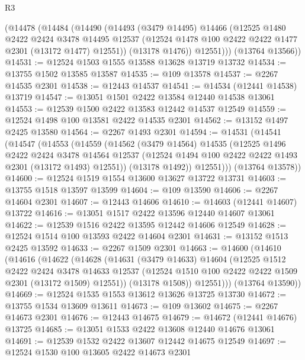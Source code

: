 \begin{lexlean}{R3}
\begin{coremodule}
      (@14478
        (@14484
          (@14490
            (@14493
              (@3479 @14495)
              @14466
              (@12525
                @1480
                @2422
                @2424
                @3478
                @14495
                @12537
                (@12524 @1478 @100 @2422 @2422 @1477 @2301 (@13172 @1477) @12551))
              (@13178 @1476))
            @12551)))
      (@13764 @13566))
@14531 := @12524 @1503 @1555 @13588 @13628 @13719 @13732
@14534 := @13755 @1502 @13585 @13587
@14535 := @109 @13578
@14537 := @2267 @14535 @2301
@14538 := @12443 @14537
@14541 := @14534 (@12441 @14538) @13719
@14547 := @13051 @1501 @2422 @13584 @12440 @14538 @13061
@14553 := @12539 @1500 @2422 @13583 @12442 @14537 @12549
@14559 := @12524 @1498 @100 @13581 @2422 @14535 @2301
@14562 := @13152 @1497 @2425 @13580
@14564 := @2267 @1493 @2301
@14594 := @14531
    (@14541
      (@14547
        (@14553
          (@14559
            (@14562
              (@3479 @14564)
              @14535
              (@12525
                @1496
                @2422
                @2424
                @3478
                @14564
                @12537
                (@12524 @1494 @100 @2422 @2422 @1493 @2301 (@13172 @1493) @12551))
              (@13178 @1492))
            @12551)))
      (@13764 @13578))
@14600 := @12524 @1519 @1554 @13600 @13627 @13722 @13731
@14603 := @13755 @1518 @13597 @13599
@14604 := @109 @13590
@14606 := @2267 @14604 @2301
@14607 := @12443 @14606
@14610 := @14603 (@12441 @14607) @13722
@14616 := @13051 @1517 @2422 @13596 @12440 @14607 @13061
@14622 := @12539 @1516 @2422 @13595 @12442 @14606 @12549
@14628 := @12524 @1514 @100 @13593 @2422 @14604 @2301
@14631 := @13152 @1513 @2425 @13592
@14633 := @2267 @1509 @2301
@14663 := @14600
    (@14610
      (@14616
        (@14622
          (@14628
            (@14631
              (@3479 @14633)
              @14604
              (@12525
                @1512
                @2422
                @2424
                @3478
                @14633
                @12537
                (@12524 @1510 @100 @2422 @2422 @1509 @2301 (@13172 @1509) @12551))
              (@13178 @1508))
            @12551)))
      (@13764 @13590))
@14669 := @12524 @1535 @1553 @13612 @13626 @13725 @13730
@14672 := @13755 @1534 @13609 @13611
@14673 := @109 @13602
@14675 := @2267 @14673 @2301
@14676 := @12443 @14675
@14679 := @14672 (@12441 @14676) @13725
@14685 := @13051 @1533 @2422 @13608 @12440 @14676 @13061
@14691 := @12539 @1532 @2422 @13607 @12442 @14675 @12549
@14697 := @12524 @1530 @100 @13605 @2422 @14673 @2301

\end{coremodule}
\end{lexlean}
